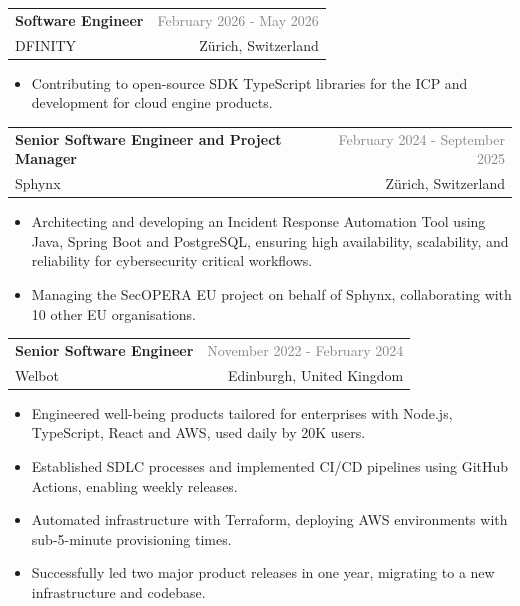\documentclass[a4paper,11pt]{article}
\makeatletter
\newcommand{\dateString}[1]{
   \textcolor{gray}{\small{#1}}
}
\newcommand{\resumeSubheading}[4]{
\vspace{0.5mm}\item
   \begin{tabular*}{0.98\textwidth}[t]{l@{\extracolsep{\fill}}r}
      \textbf{#1} & \dateString{#4} \\
      \small{#3} &  \small{#2}\\
   \end{tabular*}
   \vspace{-2mm}
}
\newcommand{\cvItem}[1]{
   \item \small #1
}
\newcommand{\resumeItemListStart}{
   \begin{justify}
   \begin{itemize}[label={\textbullet}, leftmargin=2ex, labelsep=0.3em, rightmargin=2ex, itemsep=0mm]
   \small
}
\newcommand{\resumeItemListEnd}{\end{itemize}\end{justify}}
\newcommand{\resumeItemSeparator}{\vspace{0.0mm}}
\newcommand{\resumeSubheadingSeparator}{\vspace{-1mm}}
\makeatother
\begin{document}
   \resumeSubheading
      {Software Engineer}{Zürich, Switzerland}
      {DFINITY}{February 2026 - May 2026}
      \resumeSubheadingSeparator
      \resumeItemListStart
         \cvItem {Contributing to open-source SDK TypeScript libraries for the ICP and development for cloud engine products.}
      \resumeItemListEnd

   \resumeItemSeparator

   \resumeSubheading
      {Senior Software Engineer and Project Manager}{Zürich, Switzerland}
      {Sphynx}{February 2024 - September 2025}
      \resumeSubheadingSeparator
      \resumeItemListStart
         \cvItem {Architecting and developing an Incident Response Automation Tool using Java, Spring Boot and PostgreSQL, ensuring high availability, scalability, and reliability for cybersecurity critical workflows.}
         \cvItem {Managing the SecOPERA EU project on behalf of Sphynx, collaborating with 10 other EU organisations.}
      \resumeItemListEnd

   \resumeItemSeparator

   \resumeSubheading
      {Senior Software Engineer}{Edinburgh, United Kingdom}
      {Welbot}{November 2022 - February 2024}
      \resumeSubheadingSeparator
      \resumeItemListStart
         \cvItem {Engineered well-being products tailored for enterprises with Node.js, TypeScript, React and AWS, used daily by 20K users.}
         \cvItem {Established SDLC processes and implemented CI/CD pipelines using GitHub Actions, enabling weekly releases.}
         \cvItem {Automated infrastructure with Terraform, deploying AWS environments with sub-5-minute provisioning times.}
         \cvItem {Successfully led two major product releases in one year, migrating to a new infrastructure and codebase.}
      \resumeItemListEnd

   \resumeItemSeparator



\end{document}
